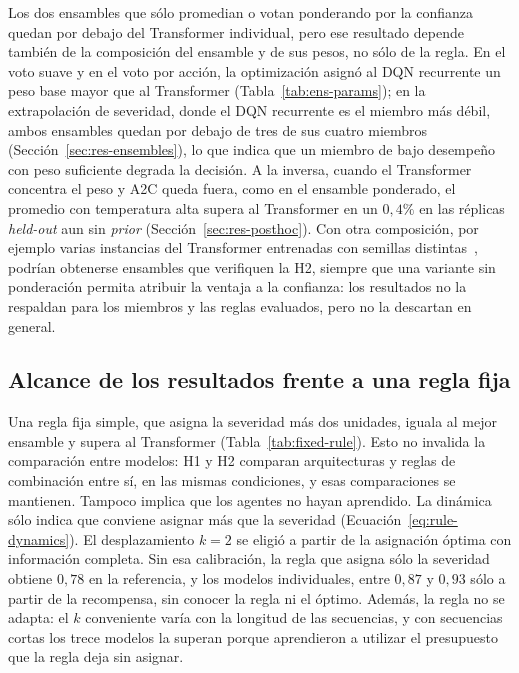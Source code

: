 \documentclass[../00_Main/Main.tex]{subfiles}
\begin{document}
Los dos ensambles que s\'olo promedian o votan ponderando por la confianza
quedan por debajo del Transformer individual, pero ese resultado depende
tambi\'en de la composici\'on del ensamble y de sus pesos, no s\'olo de la
regla. En el voto suave y en el voto por acci\'on, la optimizaci\'on
asign\'o al DQN recurrente un peso base mayor que al Transformer
(Tabla~\ref{tab:ens-params}); en la extrapolaci\'on de severidad, donde el
DQN recurrente es el miembro m\'as d\'ebil, ambos ensambles quedan por
debajo de tres de sus cuatro miembros (Secci\'on~\ref{sec:res-ensembles}),
lo que indica que un miembro de bajo desempe\~no con peso suficiente
degrada la decisi\'on.
A la inversa, cuando el Transformer concentra el peso y A2C queda fuera,
como en el ensamble ponderado, el promedio con temperatura alta supera al
Transformer en un $0{,}4\%$ en las r\'eplicas \emph{held-out} aun sin
\emph{prior} (Secci\'on~\ref{sec:res-posthoc}). Con otra composici\'on, por
ejemplo varias instancias del Transformer entrenadas con semillas
distintas~\citep{Lakshminarayanan2017}, podr\'ian obtenerse ensambles que
verifiquen la H2, siempre que una variante sin ponderaci\'on permita
atribuir la ventaja a la confianza: los resultados no la respaldan para los miembros y las
reglas evaluados, pero no la descartan en general.

\subsection{Alcance de los resultados frente a una regla fija}\label{sec:disc-rule}

Una regla fija simple, que asigna la severidad m\'as dos unidades,
iguala al mejor ensamble y supera al Transformer
(Tabla~\ref{tab:fixed-rule}). Esto no invalida la comparaci\'on entre modelos: H1 y H2 comparan
arquitecturas y reglas de combinaci\'on entre s\'i, en las mismas
condiciones, y esas comparaciones se mantienen. Tampoco implica que los
agentes no hayan aprendido. La din\'amica s\'olo indica que conviene
asignar m\'as que la severidad (Ecuaci\'on~\eqref{eq:rule-dynamics}). El
desplazamiento $k = 2$ se eligi\'o a partir de la asignaci\'on \'optima con
informaci\'on completa. Sin esa calibraci\'on, la regla que asigna s\'olo la severidad obtiene
$0{,}78$ en la referencia, y los modelos individuales, entre $0{,}87$ y
$0{,}93$ s\'olo a partir de la recompensa, sin conocer la regla ni el \'optimo.
Adem\'as, la regla no se adapta: el $k$ conveniente var\'ia con la
longitud de las secuencias, y con secuencias cortas los trece modelos la
superan porque aprendieron a utilizar el presupuesto que la regla deja sin
asignar.
\end{document}
